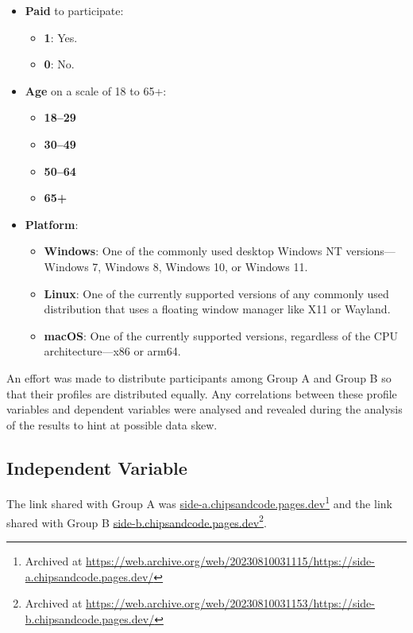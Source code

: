 \begin{itemize}
    \item \textbf{Paid} to participate:
    \begin{itemize}[]
        \item \textbf{1}: Yes.
        \item \textbf{0}: No.
    \end{itemize}
    \item \textbf{Age} on a scale of 18 to 65+:
    \begin{itemize}[]
        \item \textbf{18--29}
        \item \textbf{30--49}
        \item \textbf{50--64}
        \item \textbf{65+}
    \end{itemize}
    \item \textbf{Platform}:
    \begin{itemize}[]
        \item \textbf{Windows}: One of the commonly used desktop Windows NT versions---Windows 7, Windows 8, Windows 10, or Windows 11.
        \item \textbf{Linux}: One of the currently supported versions of any commonly used distribution that uses a floating window manager like X11 or Wayland.
        \item \textbf{macOS}: One of the currently supported versions, regardless of the CPU architecture---x86 or arm64.
    \end{itemize}
\end{itemize}

An effort was made to distribute participants among Group A and Group B so that their profiles are distributed equally.
Any correlations between these profile variables and dependent variables were analysed and revealed during the analysis of the results to hint at possible data skew.

\subsection{Independent Variable}

The link shared with Group A was \href{https://side-a.chipsandcode.pages.dev/}{side-a.chipsandcode.pages.dev}\footnote{Archived at \url{https://web.archive.org/web/20230810031115/https://side-a.chipsandcode.pages.dev/}} and the link shared with Group B \href{https://side-b.chipsandcode.pages.dev/}{side-b.chipsandcode.pages.dev}\footnote{Archived at \url{https://web.archive.org/web/20230810031153/https://side-b.chipsandcode.pages.dev/}}.

